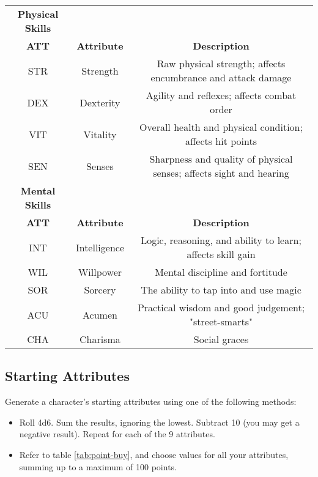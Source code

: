 
\begin{table}[h!]
    \begin{tabular}{c c c}
        \bfseries{Physical Skills} \\
        \bfseries{ATT} & \bfseries{Attribute} & \bfseries{Description} \\
        STR & Strength & Raw physical strength; affects encumbrance and attack damage \\
        DEX & Dexterity & Agility and reflexes; affects combat order \\
        VIT & Vitality & Overall health and physical condition; affects hit points \\
        SEN & Senses & Sharpness and quality of physical senses; affects sight and hearing \\
        \bfseries{Mental Skills} \\
        \bfseries{ATT} & \bfseries{Attribute} & \bfseries{Description} \\
        INT & Intelligence & Logic, reasoning, and ability to learn; affects skill gain \\
        WIL & Willpower & Mental discipline and fortitude \\
        SOR & Sorcery & The ability to tap into and use magic \\
        ACU & Acumen & Practical wisdom and good judgement; "street-smarts" \\
        CHA & Charisma & Social graces \\
    \end{tabular}
    \label{tab:attributes}
\end{table}

\subsection{Starting Attributes}
Generate a character's starting attributes using one of the following methods:
\begin{itemize}
    \item Roll 4d6. Sum the results, ignoring the lowest. Subtract 10 (you may
        get a negative result). Repeat for each of the 9 attributes.
    \item Refer to table \ref{tab:point-buy}, and choose values for all your
        attributes, summing up to a maximum of 100 points.
\end{itemize}

